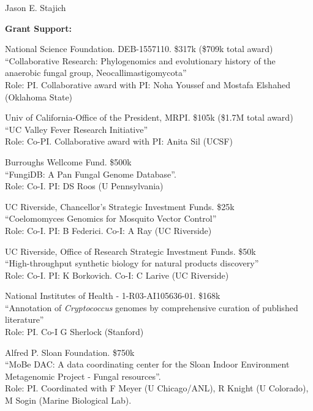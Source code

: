 \documentclass[10pt]{article}
\begin{document}
\begin{cv}{\centerline{Jason E. Stajich}}
\begin{cvlistcompact}{\bf Grant Support:}
\item [2016-2019] National Science Foundation. DEB-1557110. \$317k
  (\$709k total award) \\
``Collaborative Research: Phylogenomics and evolutionary history of the anaerobic fungal group, Neocallimastigomycota'' \\
Role: PI. Collaborative award with PI: Noha Youssef and Mostafa Elshahed (Oklahoma State)

\item [2017-2020] Univ of California-Office of the President, MRPI. \$105k
  (\$1.7M total award) \\
``UC Valley Fever Research Initiative'' \\
Role: Co-PI. Collaborative award with PI: Anita Sil (UCSF)

\item [{\bf Completed support}]

\item [2010-2013] Burroughs Wellcome Fund. \$500k \\
 ``FungiDB: A Pan Fungal Genome Database''. \\
Role: Co-I. PI: DS Roos (U Pennsylvania)

\item [2011-2012] UC Riverside, Chancellor's Strategic Investment
  Funds. \$25k \\
``Coelomomyces Genomics for Mosquito Vector Control'' \\
Role: Co-I. PI: B Federici. Co-I: A Ray (UC Riverside)

\item [2013-2014] UC Riverside, Office of Research Strategic Investment
  Funds. \$50k \\
``High-throughput synthetic biology for natural products discovery'' \\
Role: Co-I. PI: K Borkovich. Co-I: C Larive (UC Riverside)

\item [2013-2014] National Institutes of Health - 1-R03-AI105636-01. \$168k \\
``Annotation of \textit{Cryptococcus} genomes by comprehensive
  curation of published literature'' \\
Role: PI. Co-I G Sherlock (Stanford)

  \item [2011-2014] Alfred P. Sloan Foundation. \$750k \\
``MoBe DAC: A data coordinating center for the Sloan Indoor
Environment Metagenomic Project - Fungal resources''. \\
Role: PI.  Coordinated with F Meyer (U Chicago/ANL), R Knight (U Colorado), M Sogin (Marine Biological Lab).


\end{cvlistcompact}
\end{cv}
\end{document}
